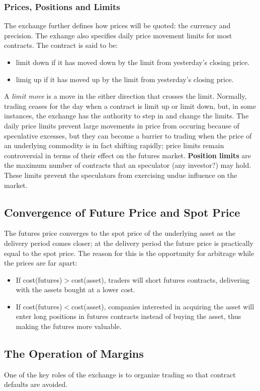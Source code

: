 \documentclass{article}
\begin{document}
\subsubsection*{Prices, Positions and Limits}
The exchange further defines how prices will be quoted: the currency and precision.
The exhange also specifies daily price movement limits for most contracts. The contract
is said to be:
\begin{itemize}
    \item limit down if it has moved down by the limit from yesterday's closing price.
    \item limig up if it has moved up by the limit from yesterday's closing price.
\end{itemize}
A \emph{limit move} is a move in the either direction that crosses the limit. Normally, trading
ceases for the day when a contract is limit up or limit down, but, in some instances, the exchange
has the authority to step in and change the limits. The daily price limits prevent large movements
in price from occuring because of speculative excesses, but they can become a barrier to trading
when the price of an underlying commodity is in fact shifting rapidly; price limits remain controversial
in terms of their effect on the futures market. \textbf{Position limits} are the maximum number of contracts
that an speculator (any investor?) may hold. These limits prevent the speculators from exercising undue
influence on the market.
\subsection{Convergence of Future Price and Spot Price}
The futures price converges to the spot price of the underlying asset as the delivery period comes closer; at
the delivery period the future price is practically equal to the spot price. The reason for this is the 
opportunity for arbitrage while the prices are far apart:
\begin{itemize}
    \item If cost(futures)$>$cost(asset), traders will short futures contracts, delivering with the assets bought at a lower cost.
    \item If cost(futures)$<$cost(asset), companies interested in acquiring the asset will enter long positions in futures contracts
    instead of buying the asset, thus making the futures more valuable.
\end{itemize}
\subsection{The Operation of Margins}
One of the key roles of the exchange is to organize trading so that contract defaults are avoided.
\end{document}
